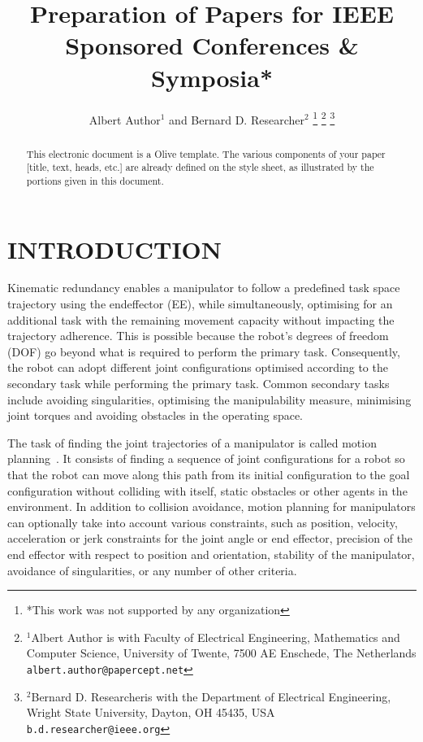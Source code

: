 \documentclass[letterpaper, 10 pt, conference]{ieeeconf}  %
\title{\LARGE \bf
Preparation of Papers for IEEE Sponsored Conferences \& Symposia*
}
\author{Albert Author$^{1}$ and Bernard D. Researcher$^{2}$%
\thanks{*This work was not supported by any organization}%
\thanks{$^{1}$Albert Author is with Faculty of Electrical Engineering, Mathematics and Computer Science,
        University of Twente, 7500 AE Enschede, The Netherlands
        {\tt\small albert.author@papercept.net}}%
\thanks{$^{2}$Bernard D. Researcheris with the Department of Electrical Engineering, Wright State University,
        Dayton, OH 45435, USA
        {\tt\small b.d.researcher@ieee.org}}%
}
\begin{document}
\maketitle
\thispagestyle{empty}
\pagestyle{empty}


\begin{abstract}

This electronic document is a Olive template. The various components of your paper [title, text, heads, etc.] are already defined on the style sheet, as illustrated by the portions given in this document.

\end{abstract}


\section{INTRODUCTION}


Kinematic redundancy enables a manipulator to follow a predefined task space trajectory using the endeffector (EE), while simultaneously, optimising for an additional task with the remaining movement capacity without impacting the trajectory adherence. This is possible because the robot's degrees of freedom (DOF) go beyond what is required to perform the primary task. Consequently, the robot can adopt different joint configurations optimised according to the secondary task while performing the primary task. Common secondary tasks include avoiding singularities, optimising the manipulability measure, minimising joint torques and avoiding obstacles in the operating space.


The task of finding the joint trajectories of a manipulator is called motion planning~\cite{IDEASLab2023}. It consists of finding a sequence of joint configurations for a robot so that the robot can move along this path from its initial configuration to the goal configuration without colliding with itself, static obstacles or other agents in the environment. In addition to collision avoidance, motion planning for manipulators can optionally take into account various constraints, such as position, velocity, acceleration or jerk constraints for the joint angle or end effector, precision of the end effector with respect to position and orientation, stability of the manipulator, avoidance of singularities, or any number of other criteria.
\end{document}
